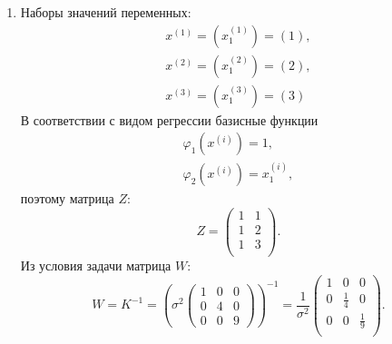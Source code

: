 \documentclass[a4paper,12pt]{article}
\begin{document}
\begin{enumerate}
    \item
          Наборы значений переменных:
          \begin{gather*}
              x^{(1)} = ( x_1^{(1)}) = ( 1 ) , \\
              x^{(2)} = ( x_1^{(2)}) = ( 2 ) , \\
              x^{(3)} = ( x_1^{(3)}) = ( 3 )
          \end{gather*}
          В соответствии с видом регрессии базисные функции
          \begin{gather*}
              \varphi_1(x^{(i)}) = 1 , \\
              \varphi_2(x^{(i)}) = x_1^{(i)} ,
          \end{gather*}
          поэтому матрица $Z$:
          \[
              Z
              = \begin{pmatrix}
                  1 & 1 \\
                  1 & 2 \\
                  1 & 3 \\
              \end{pmatrix} .
          \]
          Из условия задачи матрица $W$:
          \[
              W
              = K^{-1}
              = \left(
              \sigma^2
              \begin{pmatrix}
                  1 & 0 & 0 \\
                  0 & 4 & 0 \\
                  0 & 0 & 9
              \end{pmatrix}
              \right)^{-1}
              = \frac{1}{\sigma^2}
              \begin{pmatrix}
                  1 & 0           & 0           \\
                  0 & \frac{1}{4} & 0           \\
                  0 & 0           & \frac{1}{9} \\
              \end{pmatrix} .
          \]


\end{enumerate}
\end{document}
